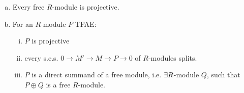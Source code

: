 \documentclass[a4paper]{report}
\begin{document}
\begin{prop}%
\begin{enumerate}[(a)]
  \item Every free $R$-module is projective.
  \item For an $R$-module $P$ TFAE:
        \begin{enumerate}[(i)]
          \item $P$ is projective
          \item every s.e.s. $0 \to M' \to M \to P \to 0$ of $R$-modules splits.
                \item $P$ is a direct summand of a free module, i.e. $\exists R$-module $Q$, such that $P \oplus Q$ is a free $R$-module.
        \end{enumerate}
\end{enumerate}
\end{prop}
\end{document}
